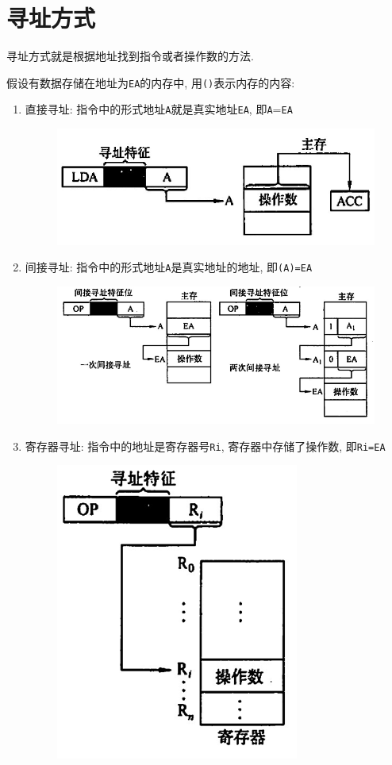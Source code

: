 \section{寻址方式}
寻址方式就是根据地址找到指令或者操作数的方法. \par 假设有数据存储在地址为\verb|EA|的内存中, 用\verb|()|表示内存的内容:
\begin{enumerate}
\item 直接寻址: 指令中的形式地址\verb|A|就是真实地址\verb|EA|, 即\verb|A|=\verb|EA|
\begin{figure}[H]
\centering
\includegraphics[scale=.6]{img/figure3.png}
\end{figure}
\item 间接寻址: 指令中的形式地址\verb|A|是真实地址的地址, 即\verb|(A)=EA|
\begin{figure}[H]
\centering
\includegraphics[scale=.6]{img/figure4.png}
\end{figure}
\item 寄存器寻址: 指令中的地址是寄存器号\verb|Ri|, 寄存器中存储了操作数, 即\verb|Ri=EA|
\begin{figure}[H]
\centering
\includegraphics[scale=.6]{img/figure5.png}

\end{figure}
\end{enumerate}

